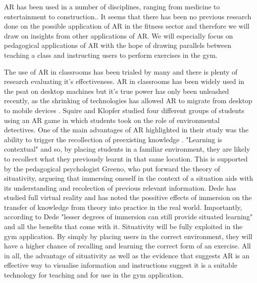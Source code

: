 \documentclass{l4proj}
\begin{document}
\pagebreak

AR has been used in a number of disciplines, ranging from medicine to entertainment to construction.\cite{azuma_recent_2001}. It seems that there has been no previous research done on the possible application of AR in the fitness sector and therefore we will draw on insights from other applications of AR. We will especially focus on pedagogical applications of AR with the hope of drawing parallels between teaching a class and instructing users to perform exercises in the gym. 

The use of AR in classrooms has been trialed by many and there is plenty of research evaluating it's effectiveness.
AR in classrooms has been widely used in the psat on desktop machines \cite{iordache_comparison_2009} but it's true power has only been unleashed recently, as the shrinking of technologies has allowed AR to migrate from desktop to mobile devices \cite{squire_augmented_2007}. Squire and Klopfer studied four different groups of students using an AR game in which students took on the role of environmental detectives. One of the main advantages of AR highlighted in their study was the ability to trigger the recollection of preexisting knowledge \cite{squire_augmented_2007}. "Learning is contextual" \cite{liestol_learning_2011} and so, by placing students in a familiar environment, they are likely to recollect what they previously learnt in that same location. This is supported by the pedagogical psychologist Greeno, who put forward the theory of situativity, argueing that immersing oneself in the context of a situation aids with its understanding and recolection of previous relevant information\cite{greeno_situativity_1998}. Dede has studied full virtual reality and has noted the possitive effects of immersion on the transfer of knowledge from theory into practice in the real world\cite{dede_immersive_2009}. Importantly, according to Dede "lesser degrees of immersion can still provide situated learning" and all the benefits that come with it\cite{dede_immersive_2009}. Situativity will be fully exploited in the gym application. By simply by placing users in the correct environment, they will have a higher chance of recalling and learning the correct form of an exercise. All in all, the advantage of situativity as well as the evidence that suggests AR is an effective way to visualise information and instructions \cite{squire_augmented_2007} suggest it is a suitable technology for teaching and for use in the gym application.
\end{document}
